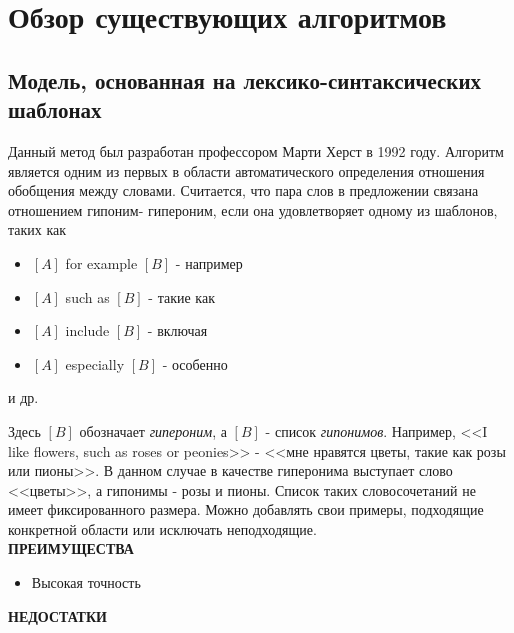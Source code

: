 \section{Обзор существующих алгоритмов}
\label{sec:Chapter_2} 
\large

\subsection{Модель, основанная на лексико-синтаксических шаблонах}

Данный метод был разработан профессором Марти Херст в 1992 году. Алгоритм является
одним из первых в области автоматического определения отношения обобщения между
словами. Считается, что пара слов в предложении связана отношением гипоним-
гипероним, если она удовлетворяет одному из шаблонов, таких как

\begin{itemize}
\item $[A]$ for example $[B]$ - например
\item $[A]$ such as $[B]$ - такие как
\item $[A]$ include $[B]$ - включая
\item $[A]$ especially $[B]$ - особенно
\end{itemize}
и др.

Здесь $[B]$ обозначает \textit{гипероним}, а $[B]$ - список \textit{гипонимов}. Например, <<I like flowers, such as
roses or peonies>> - <<мне нравятся цветы, такие как розы или пионы>>. В данном случае в
качестве гиперонима выступает слово <<цветы>>, а гипонимы - розы и пионы.
Список таких словосочетаний не имеет фиксированного размера. Можно добавлять свои
примеры, подходящие конкретной области или исключать неподходящие.\\

\textbf{ПРЕИМУЩЕСТВА}

\begin{itemize}
\item Высокая точность
\end{itemize}

\textbf{НЕДОСТАТКИ}

